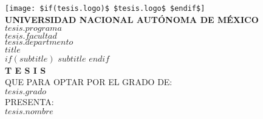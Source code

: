 

\pagestyle{plain} %

\begin{titlepage}
    \begin{center}
        \vspace*{-0.5cm} %
        
        \texttt{[image: \$if(tesis.logo)\$ \$tesis.logo\$ \$endif\$]}\\[0.5cm]
        
        {\large \textbf{UNIVERSIDAD NACIONAL AUTÓNOMA DE MÉXICO}}\\[0.4cm]
        
        {\large \textbf{\MakeUppercase{$tesis.programa$}}}\\[1cm]
        
        {\large \MakeUppercase{$tesis.facultad$}}\\[0.4cm]
        {\large \MakeUppercase{$tesis.departmento$}}\\[1.2cm]
        
        {\Large \textbf{$title$}}\\[0.3cm]
        {\small $if(subtitle)$ $subtitle$ $endif$}\\[0.6cm]
        
        {\LARGE \textbf{T E S I S}}\\[1cm]
        
        {\large QUE PARA OPTAR POR EL GRADO DE:}\\[0.15cm]
        {\Large \textbf{$tesis.grado$}}\\[0.8cm]
        
        {\large PRESENTA:}\\[0.3cm]
        {\LARGE \textbf{$tesis.nombre$}}\\[0.8cm]
        

\end{center}
\end{titlepage}
